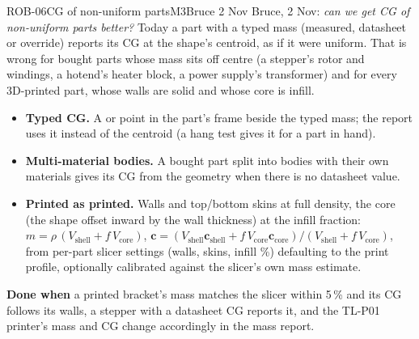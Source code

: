\begin{epic}{ROB-06}{CG of non-uniform parts}{M3}{\stTodo}{Bruce 2 Nov}
Bruce, 2 Nov: \emph{can we get CG of non-uniform parts better?} Today a part with a typed mass (measured,
datasheet or override) reports its CG at the shape's centroid, as if it were uniform. That is wrong for bought
parts whose mass sits off centre (a stepper's rotor and windings, a hotend's heater block, a power supply's
transformer) and for every 3D-printed part, whose walls are solid and whose core is infill.
\begin{itemize}
\item \textbf{Typed CG.} A  or  point in the part's frame beside the typed mass;
the report uses it instead of the centroid (a hang test gives it for a part in hand).
\item \textbf{Multi-material bodies.} A bought part split into bodies with their own materials gives its CG from
the geometry when there is no datasheet value.
\item \textbf{Printed as printed.} Walls and top/bottom skins at full density, the core (the shape offset inward
by the wall thickness) at the infill fraction: $m=\rho\,(V_{\text{shell}}+f\,V_{\text{core}})$,
$\mathbf c=(V_{\text{shell}}\mathbf c_{\text{shell}}+f\,V_{\text{core}}\mathbf c_{\text{core}})/(V_{\text{shell}}+f\,V_{\text{core}})$,
from per-part slicer settings (walls, skins, infill \%) defaulting to the print profile, optionally calibrated
against the slicer's own mass estimate.
\end{itemize}
\textbf{Done when} a printed bracket's mass matches the slicer within 5\,\% and its CG follows its walls, a stepper
with a datasheet CG reports it, and the TL-P01 printer's mass and CG change accordingly in the mass report.
\end{epic}
